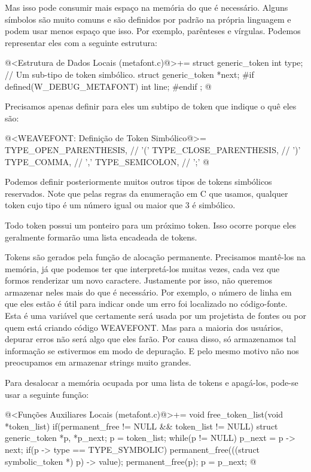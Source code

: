 Mas isso pode consumir mais espaço na memória do que é
necessário. Alguns símbolos são muito comuns e são definidos por
padrão na própria linguagem e podem usar menos espaço que isso. Por
exemplo, parênteses e vírgulas. Podemos representar eles com a
seguinte estrutura:

\iniciocodigo
@<Estrutura de Dados Locais (metafont.c)@>+=
struct generic_token{
  int type;   // Um sub-tipo de token simbólico.
  struct generic_token *next;
#if defined(W_DEBUG_METAFONT)
  int line;
#endif
};
@
\fimcodigo

Precisamos apenas definir para eles um subtipo de token que indique o quê
eles são:

\iniciocodigo
@<WEAVEFONT: Definição de Token Simbólico@>=
TYPE_OPEN_PARENTHESIS,  // '('
TYPE_CLOSE_PARENTHESIS, // ')'
TYPE_COMMA,             // ','
TYPE_SEMICOLON,         // ';'
@
\fimcodigo

Podemos definir posteriormente muitos outros tipos de tokens
simbólicos reservados. Note que pelas regras da enumeração em C que
usamos, qualquer token cujo tipo é um número igual ou maior que 3 é
simbólico.

Todo token possui um ponteiro para um próximo token. Isso ocorre
porque eles geralmente formarão uma lista encadeada de tokens.

Tokens são gerados pela função de alocação permanente. Precisamos
mantê-los na memória, já que podemos ter que interpretá-los muitas
vezes, cada vez que formos renderizar um novo caractere. Justamente
por isso, não queremos armazenar neles mais do que é necessário. Por
exemplo, o número de linha em que eles estão é útil para indicar onde
um erro foi localizado no código-fonte. Esta é uma variável que
certamente será usada por um projetista de fontes ou por quem está
criando código WEAVEFONT. Mas para a maioria dos usuários, depurar
erros não será algo que eles farão. Por causa disso, só armazenamos
tal informação se estivermos em modo de depuração. E pelo mesmo motivo
não nos preocupamos em armazenar strings muito grandes.

Para desalocar a memória ocupada por uma lista de tokens e apagá-los,
pode-se usar a seguinte função:

\iniciocodigo
@<Funções Auxiliares Locais (metafont.c)@>+=
void free_token_list(void *token_list){
  if(permanent_free != NULL && token_list != NULL){
    struct generic_token *p, *p_next;
    p = token_list;
    while(p != NULL){
      p_next = p -> next;
      if(p -> type == TYPE_SYMBOLIC)
        permanent_free(((struct symbolic_token *) p) -> value);
      permanent_free(p);
      p = p_next;
    }
  }
}
@
\fimcodigo

